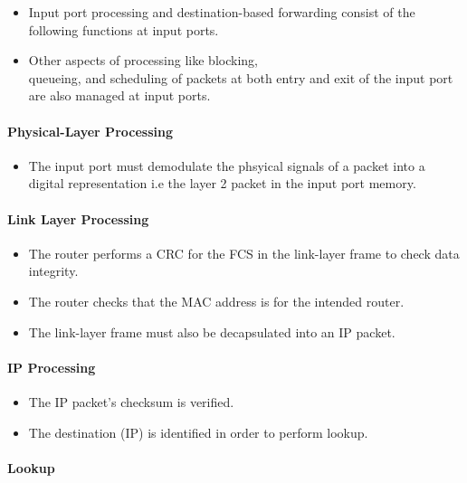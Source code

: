\documentclass{article}
\begin{document}
\begin{itemize}
    \item Input port processing and destination-based forwarding consist of the following functions at input ports.
    \item Other aspects of  processing like blocking, \\ queueing, and scheduling of packets at both entry and exit of the input port are also managed at input ports.
\end{itemize}


\paragraph{Physical-Layer Processing}

\begin{itemize}
    \item The input port must demodulate the phsyical signals of a packet into a digital representation i.e the layer 2 packet in the input port memory.
\end{itemize}

\paragraph{Link Layer Processing}

\begin{itemize}
    \item The router performs a CRC for the FCS in the link-layer frame to check data integrity.
    \item The router checks that the MAC address is for the intended router.
    \item The link-layer frame must also be decapsulated into an IP packet.
\end{itemize}

\paragraph{IP Processing}

\begin{itemize}
    \item The IP packet's checksum is verified.
    \item The destination (IP) is identified in order to perform lookup.
\end{itemize}

\paragraph{Lookup}
\end{document}
